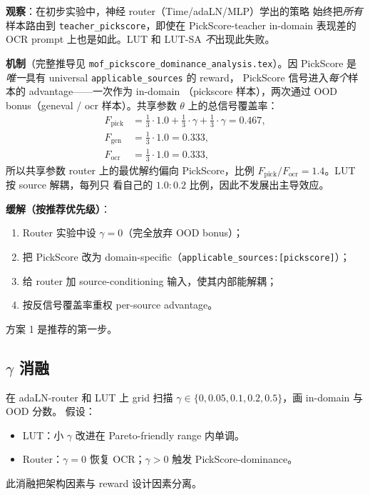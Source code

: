 \documentclass[11pt,a4paper]{article}
\theoremstyle{definition}
\begin{document}
\textbf{观察}：在初步实验中，神经 router（Time/adaLN/MLP）学出的策略
始终把\emph{所有}样本路由到 \texttt{teacher\_pickscore}，即使在
PickScore-teacher in-domain 表现差的 OCR prompt 上也是如此。LUT 和
LUT-SA \emph{不}出现此失败。

\textbf{机制}（完整推导见
\texttt{mof\_pickscore\_dominance\_analysis.tex}）。因 PickScore 是
\emph{唯一}具有 universal \texttt{applicable\_sources} 的 reward，
PickScore 信号进入\emph{每个}样本的 advantage——一次作为 in-domain
（pickscore 样本），两次通过 OOD bonus（geneval / ocr 样本）。共享参数
$\theta$ 上的总信号覆盖率：
\begin{align}
F_{\text{pick}} &= \tfrac{1}{3}\!\cdot\!1.0 + \tfrac{1}{3}\!\cdot\!\gamma + \tfrac{1}{3}\!\cdot\!\gamma = 0.467,\\
F_{\text{gen}}  &= \tfrac{1}{3}\!\cdot\!1.0 = 0.333,\\
F_{\text{ocr}}  &= \tfrac{1}{3}\!\cdot\!1.0 = 0.333,
\end{align}
所以共享参数 router 上的最优解约偏向 PickScore，比例
$F_{\text{pick}} / F_{\text{ocr}} = 1.4$。LUT 按 source 解耦，每列只
看自己的 $1.0 \!:\! 0.2$ 比例，因此不发展出主导效应。

\textbf{缓解（按推荐优先级）}：
\begin{enumerate}[leftmargin=1.5em]
\item Router 实验中设 $\gamma = 0$（完全放弃 OOD bonus）；
\item 把 PickScore 改为 domain-specific（\texttt{applicable\_sources:[pickscore]}）；
\item 给 router 加 source-conditioning 输入，使其内部能解耦；
\item 按反信号覆盖率重权 per-source advantage。
\end{enumerate}
方案 1 是推荐的第一步。

\subsection{$\gamma$ 消融}

在 adaLN-router 和 LUT 上 grid 扫描
$\gamma \in \{0, 0.05, 0.1, 0.2, 0.5\}$，画 in-domain 与 OOD 分数。
假设：
\begin{itemize}[leftmargin=1.5em]
\item LUT：小 $\gamma$ 改进在 Pareto-friendly range 内单调。
\item Router：$\gamma = 0$ 恢复 OCR；$\gamma > 0$ 触发
PickScore-dominance。
\end{itemize}
此消融把架构因素与 reward 设计因素分离。
\end{document}
